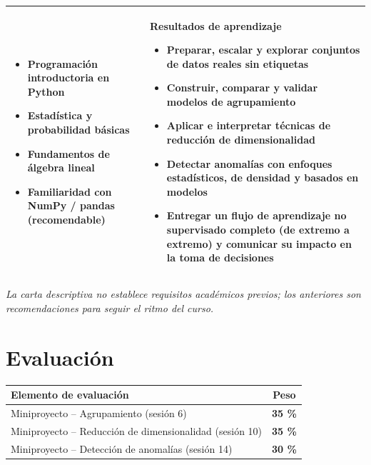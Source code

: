 \documentclass[11pt,letterpaper]{article}
\newcommand{\hd}[1]{\leavevmode\color{white}\textbf{#1}}
\begin{document}
\begin{center}
\renewcommand{\arraystretch}{1.25}
\begin{tabular}{|>{\columncolor{reqfondo}}p{}|>{\columncolor{resfondo}}p{}|}
\hline
{\color{marino}\textbf{Requisitos previos}}
\begin{itemize}[leftmargin=1.4em,topsep=2pt,itemsep=0pt]
  \item Programación introductoria en Python
  \item Estadística y probabilidad básicas
  \item Fundamentos de álgebra lineal
  \item Familiaridad con NumPy / pandas (recomendable)
\end{itemize}
&
{\color{marino}\textbf{Resultados de aprendizaje}}
\begin{itemize}[leftmargin=1.4em,topsep=2pt,itemsep=0pt]
  \item Preparar, escalar y explorar conjuntos de datos reales sin etiquetas
  \item Construir, comparar y validar modelos de agrupamiento
  \item Aplicar e interpretar técnicas de reducción de dimensionalidad
  \item Detectar anomalías con enfoques estadísticos, de densidad y basados en modelos
  \item Entregar un flujo de aprendizaje no supervisado completo (de extremo a
        extremo) y comunicar su impacto en la toma de decisiones
\end{itemize}
\\ \hline
\end{tabular}
\end{center}

{\footnotesize\itshape La carta descriptiva no establece requisitos académicos
previos; los anteriores son recomendaciones para seguir el ritmo del curso.}

\section{Evaluación}

\begin{center}
\renewcommand{\arraystretch}{1.5}
\begin{tabularx}{\textwidth}{|X|c|}
\hline
\rowcolor{marino}
{\hd{Elemento de evaluación}} & {\hd{Peso}} \\ \hline
Miniproyecto -- Agrupamiento (sesión 6)                               & \textbf{35 \%} \\ \hline
Miniproyecto -- Reducción de dimensionalidad (sesión 10)                & \textbf{35 \%} \\ \hline
Miniproyecto -- Detección de anomalías (sesión 14)                     & \textbf{30 \%} \\ \hline
\end{tabularx}
\end{center}
\end{document}
